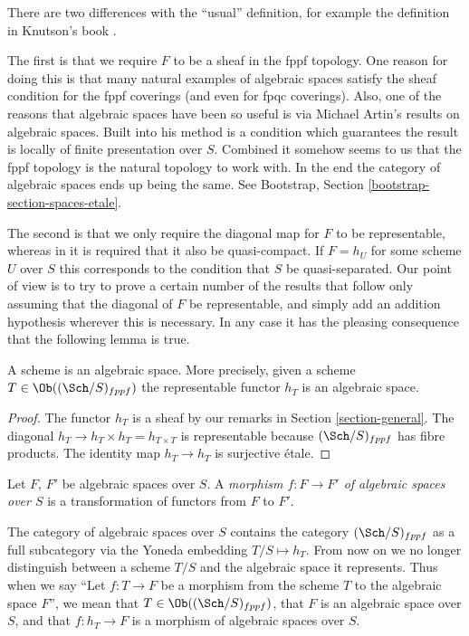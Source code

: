 \noindent
There are two differences with the ``usual'' definition, for example the
definition in Knutson's book \cite{Kn}.

\medskip\noindent
The first is that we require $F$ to be a sheaf in the fppf topology.
One reason for doing this is that many natural examples
of algebraic spaces satisfy the sheaf condition for the fppf coverings
(and even for fpqc coverings). Also, one of the reasons that algebraic
spaces have been so useful is via Michael Artin's results on algebraic spaces.
Built into his method is a condition which guarantees the result is
locally of finite presentation over $S$.
Combined it somehow seems to us that the fppf topology
is the natural topology to work with. In the end the category
of algebraic spaces ends up being the same. See
Bootstrap, Section \ref{bootstrap-section-spaces-etale}.

\medskip\noindent
The second is that we only require the diagonal map for $F$ to be
representable, whereas in \cite{Kn} it is required that it also
be quasi-compact. If $F = h_U$ for some scheme $U$ over $S$
this corresponds to the condition that $S$ be quasi-separated.
Our point of view is to try to prove a certain
number of the results that follow only assuming that the diagonal
of $F$ be representable, and simply add an addition hypothesis wherever
this is necessary. In any case it has the pleasing consequence that
the following lemma is true.

\begin{lemma}
\label{lemma-scheme-is-space}
A scheme is an algebraic space. More precisely,
given a scheme $T \in \Ob((\Sch/S)_{fppf})$
the representable functor $h_T$ is an algebraic space.
\end{lemma}

\begin{proof}
The functor $h_T$ is a sheaf by our remarks in Section \ref{section-general}.
The diagonal $h_T \to h_T \times h_T = h_{T \times T}$ is
representable because $(\Sch/S)_{fppf}$ has fibre products.
The identity map $h_T \to h_T$ is surjective \'etale.
\end{proof}

\begin{definition}
\label{definition-morphism-algebraic-spaces}
Let $F$, $F'$ be algebraic spaces over $S$.
A {\it morphism $f : F \to F'$ of algebraic spaces over $S$}
is a transformation of functors from $F$ to $F'$.
\end{definition}

\noindent
The category of algebraic spaces over $S$ contains the category
$(\Sch/S)_{fppf}$ as a full subcategory via the
Yoneda embedding $T/S \mapsto h_T$. From now on we no longer distinguish
between a scheme $T/S$ and the algebraic space it represents.
Thus when we say ``Let $f : T \to F$ be a morphism from the scheme
$T$ to the algebraic space $F$'', we mean that
$T \in \Ob((\Sch/S)_{fppf})$, that $F$ is an
algebraic space over $S$, and that $f : h_T \to F$ is a morphism
of algebraic spaces over $S$.






